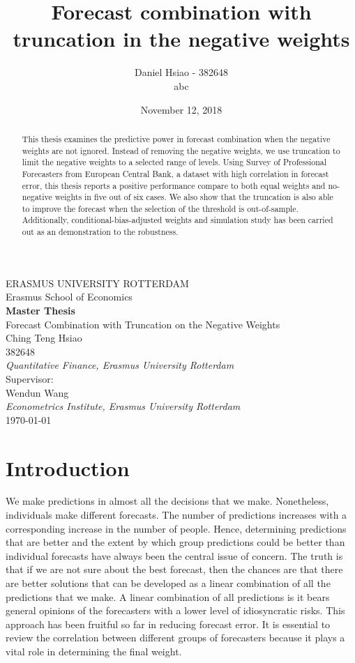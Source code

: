 \documentclass[11pt]{article}
\title{Forecast combination with truncation in the negative weights}
\author{
	Daniel Hsiao - 382648\\[2.5cm]
	abc}
\date{November 12, 2018}
\begin{document}
	\begin{titlepage}
	\centering
	{\LARGE ERASMUS UNIVERSITY ROTTERDAM}\\[0.5cm]
	{\large Erasmus School of Economics}\\[1.5cm] 
	{\large \textbf{Master Thesis}}\\[0.5cm] 	
	{\LARGE Forecast Combination with Truncation on the Negative Weights}\\[1cm] 
	{\large Ching Teng Hsiao}\\382648\\
	\textit{Quantitative Finance, Erasmus University Rotterdam}\\[1.5cm]
	{\large Supervisor: \\Wendun Wang}\\
	\textit{Econometrics Institute, Erasmus University Rotterdam}\\[ 1cm]
	{\large \today}\\[2.5cm]
	\begin{abstract}
		This thesis examines the predictive power in forecast combination when the negative weights are not ignored. Instead of removing the negative weights, we use truncation to limit the negative weights to a selected range of levels. Using Survey of Professional Forecasters from European Central Bank, a dataset with high correlation in forecast error, this thesis reports a positive performance compare to both equal weights and no-negative weights in five out of six cases. We also show that the truncation is also able to improve the forecast when the selection of the threshold is out-of-sample. Additionally, conditional-bias-adjusted weights and simulation study has been carried out as an demonstration to the robustness.
	\end{abstract}
\end{titlepage}

\newpage
{
	\setcounter{tocdepth}{3}
	\tableofcontents
}
\newpage


\section{Introduction}\label{introduction}
We make predictions in almost all the decisions that we make. Nonetheless, individuals make different forecasts. The number of predictions increases with a corresponding increase in the number of people. Hence, determining predictions that are better and the extent by which group predictions could be better than individual forecasts have always been the central issue of concern. The truth is that if we are not sure about the best forecast, then the chances are that there are better solutions that can be developed as a linear combination of all the predictions that we make. A linear combination of all predictions is it bears general opinions of the forecasters with a lower level of idiosyncratic risks. This approach has been fruitful so far in reducing forecast error. It is essential to review the correlation between different groups of forecasters because it plays a vital role in determining the final weight.
\end{document}
